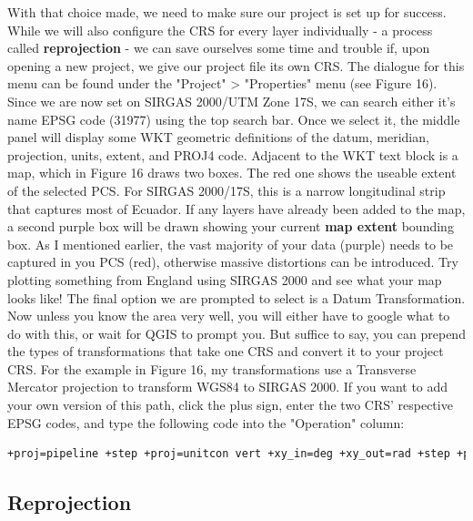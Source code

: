\documentclass{article}
\begin{document}
With that choice made, we need to make sure our project is set up for success. While we will also configure the CRS for every layer individually - a process called \textbf{reprojection} - we can save ourselves some time and trouble if, upon opening a new project, we give our project file its own CRS. The dialogue for this menu can be found under the "Project" > "Properties" menu (see Figure 16). Since we are now set on SIRGAS 2000/UTM Zone 17S, we can search either it's name EPSG code (31977) using the top search bar. Once we select it, the middle panel will display some WKT geometric definitions of the datum, meridian, projection, units, extent, and PROJ4 code. Adjacent to the WKT text block is a map, which in Figure 16 draws two boxes. The red one shows the useable extent of the selected PCS. For SIRGAS 2000/17S, this is a narrow longitudinal strip that captures most of Ecuador. If any layers have already been added to the map, a second purple box will be drawn showing your current \textbf{map extent} bounding box. As I mentioned earlier, the vast majority of your data (purple) needs to be captured in you PCS (red), otherwise massive distortions can be introduced. Try plotting something from England using SIRGAS 2000 and see what your map looks like! The final option we are prompted to select is a Datum Transformation. Now unless you know the area very well, you will either have to google what to do with this, or wait for QGIS to prompt you. But suffice to say, you can prepend the types of transformations that take one CRS and convert it to your project CRS. For the example in Figure 16, my transformations use a Transverse Mercator projection to transform WGS84 to SIRGAS 2000. If you want to add your own version of this path, click the plus sign, enter the two CRS' respective EPSG codes, and type the following code into the "Operation" column:

\begin{lstlisting}[language=bash]
    +proj=pipeline +step +proj=unitcon vert +xy_in=deg +xy_out=rad +step +proj=utm +zone=17 +south +ellps=GRS80
\end{lstlisting}

\subsection{Reprojection}
\end{document}
